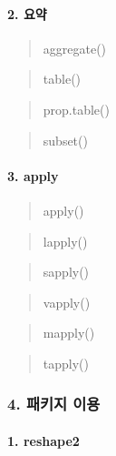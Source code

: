 \documentclass[
]{article}
\begin{document}
\hypertarget{uxc694uxc57d}{%
\paragraph{2. 요약}\label{uxc694uxc57d}}

\begin{quote}
aggregate()
\end{quote}

\begin{quote}
table()
\end{quote}

\begin{quote}
prop.table()
\end{quote}

\begin{quote}
subset()
\end{quote}

\hypertarget{apply}{%
\paragraph{3. apply}\label{apply}}

\begin{quote}
apply()
\end{quote}

\begin{quote}
lapply()
\end{quote}

\begin{quote}
sapply()
\end{quote}

\begin{quote}
vapply()
\end{quote}

\begin{quote}
mapply()
\end{quote}

\begin{quote}
tapply()
\end{quote}

\hypertarget{uxd328uxd0a4uxc9c0-uxc774uxc6a9}{%
\subsubsection{4. 패키지 이용}\label{uxd328uxd0a4uxc9c0-uxc774uxc6a9}}

\hypertarget{reshape2}{%
\paragraph{1. reshape2}\label{reshape2}}
\end{document}
